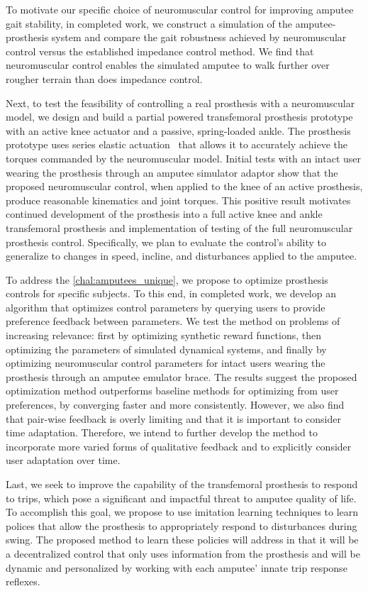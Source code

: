 To motivate our specific choice of neuromuscular control for improving amputee
gait stability, in completed work, we construct a simulation of the
amputee-prosthesis system and compare the gait robustness achieved by
neuromuscular control versus the established impedance control method. We find
that neuromuscular control enables the simulated amputee to walk further over
rougher terrain than does impedance control.

Next, to test the feasibility of controlling a real prosthesis with a
neuromuscular model, we design and build a partial powered transfemoral
prosthesis prototype with an active knee actuator and a passive, spring-loaded
ankle. The prosthesis prototype uses series elastic
actuation~\citep{pratt1995series} that allows it to accurately achieve the
torques commanded by the neuromuscular model. Initial tests with an intact user
wearing the prosthesis through an amputee simulator adaptor show that the
proposed neuromuscular control, when applied to the knee of an active
prosthesis, produce reasonable kinematics and joint torques. This positive
result motivates continued development of the prosthesis into a full active knee
and ankle transfemoral prosthesis and implementation of testing of the full
neuromuscular prosthesis control. Specifically, we plan to evaluate the
control's ability to generalize to changes in speed, incline, and disturbances
applied to the amputee.

To address the \cref{chal:amputees_unique}, we propose to optimize prosthesis
controls for specific subjects. To this end, in completed work, we develop an
algorithm that optimizes control parameters by querying users to provide
preference feedback between parameters. We test the method on problems of
increasing relevance: first by optimizing synthetic reward functions, then
optimizing the parameters of simulated dynamical systems, and finally by
optimizing neuromuscular control parameters for intact users wearing the
prosthesis through an amputee emulator brace. The results suggest the proposed
optimization method outperforms baseline methods for optimizing from user
preferences, by converging faster and more consistently. However, we also find
that pair-wise feedback is overly limiting and that it is important to consider
time adaptation. Therefore, we intend to further develop the method to
incorporate more varied forms of qualitative feedback and to explicitly consider
user adaptation over time.

Last, we seek to improve the capability of the transfemoral prosthesis to
respond to trips, which pose a significant and impactful threat to amputee
quality of life. To accomplish this goal, we propose to use imitation learning
techniques \citep{argall2009survey} to learn polices that allow the prosthesis
to appropriately respond to disturbances during swing.  The proposed method to
learn these policies will address 
in that it will be a decentralized control that only uses information from the
prosthesis and will be dynamic and personalized by working with each amputee'
innate trip response reflexes.

